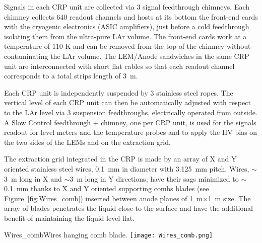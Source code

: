 Signals in each CRP unit are collected via 3 signal feedthrough
chimneys. Each chimney collects 640 readout channels and hosts at its
bottom the front-end cards with the cryogenic electronics (ASIC
amplifiers), just before a cold feedthrough isolating them from the
ultra-pure LAr volume. The front-end cards work at a temperature of
110 K and can be removed from the top of the chimney without
contaminating the LAr volume. The LEM/Anode sandwiches in the same CRP
unit are interconnected with short flat cables so that each readout
channel corresponds to a total strips length of 3~m.
  
Each CRP unit is independently suspended by 3 stainless steel
ropes. The vertical level of each CRP unit can then be automatically
adjusted with respect to the LAr level via 3 suspension feedthroughs,
electrically operated from outside. A Slow Control feedthrough +
chimney, one per CRP unit, is used for the signals readout for level
meters and the temperature probes and to apply the HV bias on the two
sides of the LEMs and on the extraction grid.

The extraction grid integrated in the CRP is made by an array of X and
Y oriented stainless steel wires, 0.1~mm in diameter with 3.125~mm
pitch.  Wires, $\sim$3~m long in X and $\sim$3~m long in Y directions, have their
sags minimized to $\sim$0.1~mm thanks to X and Y oriented supporting combs
blades (see Figure~\ref{fig:Wires_comb}) inserted between anode planes of
1~m$\times$1~m size. The array of blades penetrates the liquid close
to the surface and have the additional benefit of maintaining the
liquid level flat.
\begin{cdrfigure}{Wires_comb}{Wires hanging comb blade.}
\texttt{[image: Wires\_comb.png]}
\end{cdrfigure}



